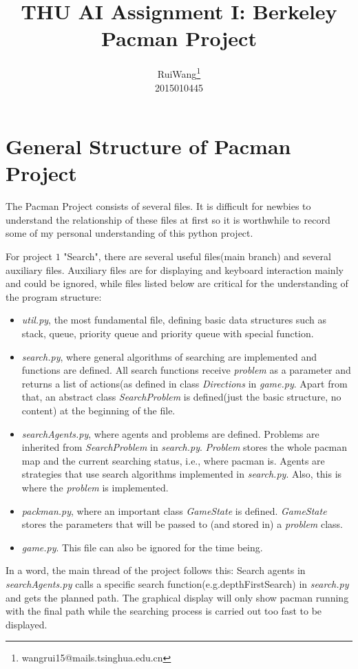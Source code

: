 \documentclass{article}
\title{THU AI Assignment I: Berkeley Pacman Project}
\author{\large Rui\hspace{0.2cm}Wang\footnote{wangrui15@mails.tsinghua.edu.cn} \\ 2015010445}
\date{}
\begin{document}
\maketitle
\section{General Structure of Pacman Project}
The Pacman Project consists of several files. It is difficult for newbies to understand the relationship of these files at first so it is worthwhile to record some of my personal understanding of this python project.\par
For project $1$ "Search", there are several useful files(main branch) and several auxiliary files. Auxiliary files are for displaying and keyboard interaction mainly and could be ignored, while files listed below are critical for the understanding of the program structure:
    \begin{itemize}
      \item \textit{util.py}, the most fundamental file, defining basic data structures such as stack, queue, priority queue and priority queue with special function.
      \item \textit{search.py}, where general algorithms of searching are implemented and functions are defined. All search functions receive \textit{problem} as a parameter and returns a list of actions(as defined in class \textit{Directions} in \textit{game.py}. Apart from that, an abstract class \textit{SearchProblem} is defined(just the basic structure, no content) at the beginning of the file.
      \item \textit{searchAgents.py}, where agents and problems are defined. Problems are inherited from \textit{SearchProblem} in \textit{search.py}. \textit{Problem} stores the whole pacman map and the current searching status, i.e., where pacman is. Agents are strategies that use search algorithms implemented in \textit{search.py}. Also, this is where the \textit{problem} is implemented.
      \item \textit{packman.py}, where an important class \textit{GameState} is defined. \textit{GameState} stores the parameters that will be passed to (and stored in) a \textit{problem} class.
      \item \textit{game.py}. This file can also be ignored for the time being.
    \end{itemize}\par
    In a word, the main thread of the project follows this: Search agents in \textit{searchAgents.py} calls a specific search function(e.g.depthFirstSearch) in \textit{search.py} and gets the planned path. The graphical display will only show pacman running with the final path while the searching process is carried out too fast to be displayed.
\end{document}

